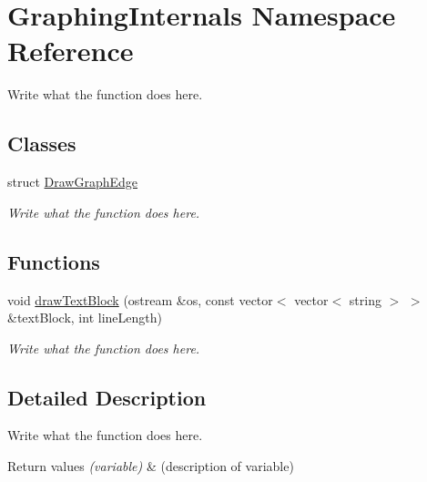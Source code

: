 \hypertarget{namespaceGraphingInternals}{\section{Graphing\+Internals Namespace Reference}
\label{namespaceGraphingInternals}
}


Write what the function does here.  


\subsection*{Classes}
\begin{DoxyCompactItemize}
\item 
struct \hyperlink{structGraphingInternals_1_1DrawGraphEdge}{Draw\+Graph\+Edge}
\begin{DoxyCompactList}\small\item\em Write what the function does here. \end{DoxyCompactList}\end{DoxyCompactItemize}
\subsection*{Functions}
\begin{DoxyCompactItemize}
\item 
void \hyperlink{namespaceGraphingInternals_ad65278d3b477dc96eb0b2b4242e49a3d}{draw\+Text\+Block} (ostream \&os, const vector$<$ vector$<$ string $>$ $>$ \&text\+Block, int line\+Length)
\begin{DoxyCompactList}\small\item\em Write what the function does here. \end{DoxyCompactList}\end{DoxyCompactItemize}


\subsection{Detailed Description}
Write what the function does here. 


\begin{DoxyRetVals}{Return values}
{\em (variable)} & (description of variable) \\
\hline
\end{DoxyRetVals}


